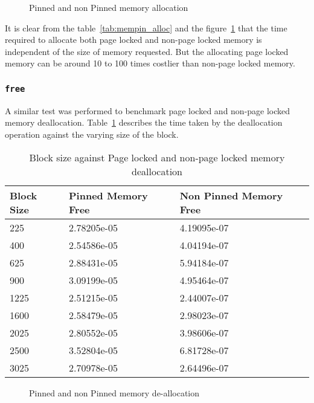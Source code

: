 \begin{figure}[h]
  
  \caption{Pinned and non Pinned memory allocation}
  \label{fig:mempin_alloc}
\end{figure}

It is clear from the table~\ref{tab:mempin_alloc} and the figure~\ref{fig:mempin_alloc}
that the time required to allocate both page locked and non-page locked memory
is independent of the size of memory requested. But the allocating page locked
memory can be around 10 to 100 times costlier than non-page locked memory.

\subsubsection{\texttt{free}}
A similar test was performed to benchmark page locked and non-page locked memory
deallocation. Table~\ref{tab:mempin_free} describes the time taken by the deallocation
operation against the varying size of the block.

\begin{table}[h]
  \centering
  \begin{tabular}{l | l | l}
    \hline
    Block Size & Pinned Memory Free & Non Pinned Memory Free \\
    \hline
    225        & 2.78205e-05        & 4.19095e-07            \\
    400        & 2.54586e-05        & 4.04194e-07            \\
    625        & 2.88431e-05        & 5.94184e-07            \\
    900        & 3.09199e-05        & 4.95464e-07            \\
    1225       & 2.51215e-05        & 2.44007e-07            \\
    1600       & 2.58479e-05        & 2.98023e-07            \\
    2025       & 2.80552e-05        & 3.98606e-07            \\
    2500       & 3.52804e-05        & 6.81728e-07            \\
    3025       & 2.70978e-05        & 2.64496e-07            \\
    \hline
  \end{tabular}
  \caption{Block size against Page locked and non-page locked memory deallocation}
  \label{tab:mempin_free}
\end{table}

\begin{figure}[h]
  
  \caption{Pinned and non Pinned memory de-allocation}
  \label{fig:mempin_free}
\end{figure}

